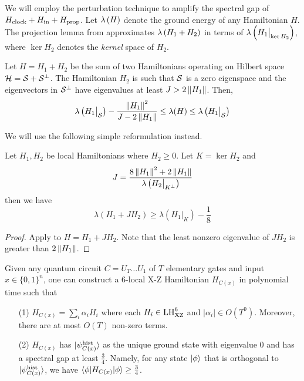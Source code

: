 We will employ the perturbation technique to amplify the spectral gap of $H_{\mathrm{clock}} + H_{\mathrm{in}} + H_{\mathrm{prop}}$. 
Let ${\lambda \left (H \right)}$ denote the ground energy of any Hamiltonian $H$. 
The projection lemma from \cite{kempe_kitaev_regev_2006} approximates ${\lambda \left (H_1 + H_2 \right)}$ in terms of ${\lambda \left (H_1\big|_{\ker H_2} \right)}$, where $\ker H_2$ denotes the \emph{kernel} space of $H_2$. 

\begin{lem}
	\label{thm:proj1}
	Let $H=H_1+H_2$ be the sum of two Hamiltonians operating on Hilbert space $\mathcal{H}=\mathcal{S}+\mathcal{S}^\bot$.
	The Hamiltonian $H_2$ is such that $\mathcal{S}$ is a zero eigenspace and the eigenvectors in $\mathcal{S}^\bot$ have eigenvalues at least $J>2\left\lVert H_1\right\rVert$. Then,
	$$\lambda\left(H_1\big|_{\mathcal{S}}\right)-\frac{\left\lVert H_1\right\rVert^2}{J-2\left\lVert H_1\right\rVert}\leq\lambda(H)\leq\lambda\left(H_1\big|_{\mathcal{S}}\right)$$
\end{lem}

We will use the following simple reformulation instead. 

\begin{lem}
	\label{lem:projection}
	Let $H_1, H_2$ be local Hamiltonians where $H_2\geq0$. Let $K=\ker H_2$ and
	$$J=\frac{8\left\lVert H_1\right\rVert^2+ 2\left\lVert H_1\right\rVert}{\lambda\left(H_2\big|_{K^\bot}\right)}$$
	then we have
	$$\lambda(H_1+JH_2)\geq\lambda\left(H_1\big|_K\right)-\frac{1}{8}$$
\end{lem}
\begin{proof}
	Apply  to $H=H_1+JH_2$. Note that the least nonzero eigenvalue of $JH_2$ is greater than $2\left\lVert H_1\right\rVert$.
\end{proof}

\begin{thm}
	\label{thm:LHReduction}
	Given any quantum circuit $C = U_T \ldots U_1$ of  $T$ elementary gates and input $x \in \{0,1\}^n$, one can construct a 6-local X-Z Hamiltonian $H_{C(x)}$ in polynomial time such that 
	\begin{enumerate}
		\item[(1)] $H_{C(x)} = \sum_i \alpha_i H_i$ where 
		each $H_i \in \mathrm{LH}_{\mathrm{XZ}}^{6}$ and $|\alpha_i| \in O(T^9)$. Moreover, there are at most $O(T)$ non-zero terms. 
		\item[(2)] $H_{C(x)}$ has $\ket{\psi_{C(x)}^{\mathrm{hist}}}$ as the unique ground state with eigenvalue $0$ and has a spectral gap at least $\frac{3}{4}$. Namely,  for any state $\ket\phi$ that is orthogonal to $\ket{\psi_{C(x)}^{\mathrm{hist}}}$, we have $\braket{\phi|H_{C(x)}|\phi}\geq \frac{3}{4}$.
	\end{enumerate}
\end{thm}

